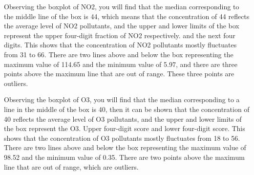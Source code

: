 \documentclass[a4paper,12pt,reqno]{report}
\begin{document}
Observing the boxplot of NO2, you will find that the median corresponding to the middle line of the box is 44, which means that the concentration of 44 reflects the average level of NO2 pollutants, and the upper and lower limits of the box represent the upper four-digit fraction of NO2 respectively. and the next four digits. This shows that the concentration of NO2 pollutants mostly fluctuates from 31 to 66. There are two lines above and below the box representing the maximum value of 114.65 and the minimum value of 5.97, and there are three points above the maximum line that are out of range. These three points are outliers.

Observing the boxplot of O3, you will find that the median corresponding to a line in the middle of the box is 40, then it can be shown that the concentration of 40 reflects the average level of O3 pollutants, and the upper and lower limits of the box represent the O3. Upper four-digit score and lower four-digit score. This shows that the concentration of O3 pollutants mostly fluctuates from 18 to 56. There are two lines above and below the box representing the maximum value of 98.52 and the minimum value of 0.35. There are two points above the maximum line that are out of range, which are outliers.

\end{document}
